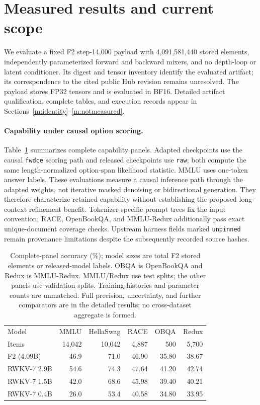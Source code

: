 \section{Measured results and current scope}
\label{m:results-summary}

We evaluate a fixed F2 step-14,000 payload with 4,091,581,440 stored elements,
independently parameterized forward and backward mixers, and no depth-loop or latent
conditioner. Its digest and tensor inventory identify the evaluated artifact; its
correspondence to the cited public Hub revision remains unresolved. The payload stores
FP32 tensors and is evaluated in BF16. Detailed artifact qualification, complete tables,
and execution records appear in Sections~\ref{m:identity}--\ref{m:notmeasured}.

\paragraph{Capability under causal option scoring.}
Table~\ref{tab:main-capability} summarizes complete capability panels. Adapted checkpoints
use the causal \texttt{fwdce} scoring path and released checkpoints use \texttt{raw};
both compute the same length-normalized option-span likelihood statistic. MMLU uses
one-token answer labels. These evaluations measure a causal inference path through the
adapted weights, not iterative masked denoising or bidirectional generation. They
therefore characterize retained capability without establishing the proposed
long-context refinement benefit. Tokenizer-specific prompt trees fix the input
convention; RACE, OpenBookQA, and MMLU-Redux additionally pass exact unique-document
coverage checks. Upstream harness fields marked \texttt{unpinned} remain provenance
limitations despite the subsequently recorded source hashes.

\begin{table}[t]
\centering\small
\setlength{\tabcolsep}{4pt}
\begin{tabular}{@{}lrrrrr@{}}
\toprule
Model & MMLU & HellaSwag & RACE & OBQA & Redux\\
Items & 14,042 & 10,042 & 4,887 & 500 & 5,700\\
\midrule
F2 (4.09B) & 46.9 & 71.0 & 46.90 & 35.80 & 38.67\\
RWKV-7 2.9B & 54.6 & 74.3 & 47.64 & 41.20 & 42.74\\
RWKV-7 1.5B & 42.0 & 68.6 & 45.98 & 39.40 & 40.21\\
RWKV-7 0.4B & 26.0 & 53.4 & 40.58 & 34.80 & 33.95\\
\bottomrule
\end{tabular}
\caption{Complete-panel accuracy (\%); model sizes are total F2 stored elements or
released-model labels. OBQA is OpenBookQA and Redux is MMLU-Redux. MMLU/Redux use test
splits; the other panels use validation splits. Training histories and parameter counts
are unmatched. Full precision, uncertainty, and further comparators are in the detailed
results; no cross-dataset aggregate is formed.}
\label{tab:main-capability}
\end{table}

